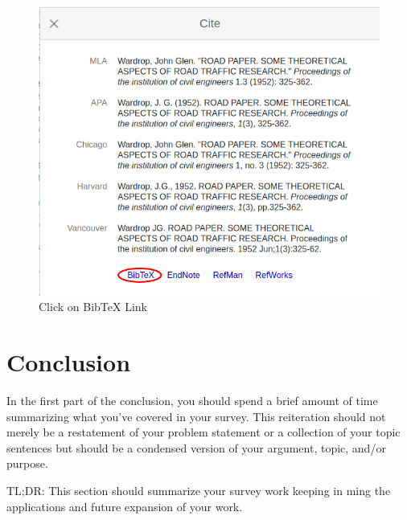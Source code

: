 \documentclass[hidelinks,14pt]{extarticle}
\begin{document}
\begin{figure}[htbp]
\centerline{\includegraphics[width=0.7\linewidth]{fig/Selection_029.png}}
\caption{Click on BibTeX Link}
\label{fig:3}
\end{figure}


\section{Conclusion}
\label{sec:5}
In the first part of the conclusion, you should spend a brief amount of time summarizing what you’ve covered in your survey. This reiteration should not merely be a restatement of your problem statement or a collection of your topic sentences but should be a condensed version of your argument, topic, and/or purpose. 

TL;DR: This section should summarize your survey work keeping in ming the applications and future expansion of your work.



\newpage


\end{document}
